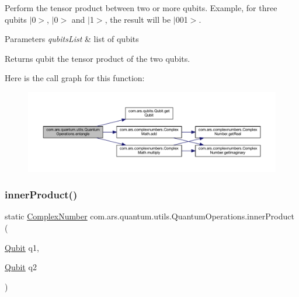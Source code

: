 Perform the tensor product between two or more qubits. Example, for three qubits $\vert$0$>$, $\vert$0$>$ and $\vert$1$>$, the result will be $\vert$001$>$.


\begin{DoxyParams}{Parameters}
{\em qubits\+List} & list of qubits \\
\hline
\end{DoxyParams}
\begin{DoxyReturn}{Returns}
qubit the tensor product of the two qubits. 
\end{DoxyReturn}
Here is the call graph for this function\+:
\nopagebreak
\begin{figure}[H]
\begin{center}
\leavevmode
\includegraphics[width=350pt]{classcom_1_1ars_1_1quantum_1_1utils_1_1_quantum_operations_a07fa9b19071084da9dee99b449fc2e26_cgraph}
\end{center}
\end{figure}
\hypertarget{classcom_1_1ars_1_1quantum_1_1utils_1_1_quantum_operations_a2343b850a5ad63b03644cdbd276d3bae}{}\label{classcom_1_1ars_1_1quantum_1_1utils_1_1_quantum_operations_a2343b850a5ad63b03644cdbd276d3bae} 
\subsubsection{\texorpdfstring{inner\+Product()}{innerProduct()}\hspace{0.1cm}{\footnotesize\ttfamily [1/2]}}
{\footnotesize\ttfamily static \hyperlink{classcom_1_1ars_1_1complexnumbers_1_1_complex_number}{Complex\+Number} com.\+ars.\+quantum.\+utils.\+Quantum\+Operations.\+inner\+Product (\begin{DoxyParamCaption}\item[{\hyperlink{classcom_1_1ars_1_1qubits_1_1_qubit}{Qubit}}]{q1,  }\item[{\hyperlink{classcom_1_1ars_1_1qubits_1_1_qubit}{Qubit}}]{q2 }\end{DoxyParamCaption})\hspace{0.3cm}{\ttfamily [static]}}

